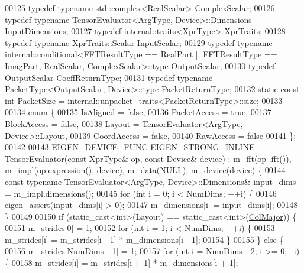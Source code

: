 \begin{DoxyCode}
00125   \textcolor{keyword}{typedef} \textcolor{keyword}{typename} std::complex<RealScalar> ComplexScalar;
00126   \textcolor{keyword}{typedef} \textcolor{keyword}{typename} TensorEvaluator<ArgType, Device>::Dimensions InputDimensions;
00127   \textcolor{keyword}{typedef} internal::traits<XprType> XprTraits;
00128   \textcolor{keyword}{typedef} \textcolor{keyword}{typename} XprTraits::Scalar InputScalar;
00129   \textcolor{keyword}{typedef} \textcolor{keyword}{typename} internal::conditional<FFTResultType == RealPart || FFTResultType == ImagPart,
       RealScalar, ComplexScalar>::type OutputScalar;
00130   \textcolor{keyword}{typedef} OutputScalar CoeffReturnType;
00131   \textcolor{keyword}{typedef} \textcolor{keyword}{typename} PacketType<OutputScalar, Device>::type PacketReturnType;
00132   \textcolor{keyword}{static} \textcolor{keyword}{const} \textcolor{keywordtype}{int} PacketSize = internal::unpacket\_traits<PacketReturnType>::size;
00133 
00134   \textcolor{keyword}{enum} \{
00135     IsAligned = \textcolor{keyword}{false},
00136     PacketAccess = \textcolor{keyword}{true},
00137     BlockAccess = \textcolor{keyword}{false},
00138     Layout = TensorEvaluator<ArgType, Device>::Layout,
00139     CoordAccess = \textcolor{keyword}{false},
00140     RawAccess = \textcolor{keyword}{false}
00141   \};
00142 
00143   EIGEN\_DEVICE\_FUNC EIGEN\_STRONG\_INLINE TensorEvaluator(\textcolor{keyword}{const} XprType& op, \textcolor{keyword}{const} Device& device) : m\_fft(op
      .fft()), m\_impl(op.expression(), device), m\_data(NULL), m\_device(device) \{
00144     \textcolor{keyword}{const} \textcolor{keyword}{typename} TensorEvaluator<ArgType, Device>::Dimensions& input\_dims = m\_impl.dimensions();
00145     \textcolor{keywordflow}{for} (\textcolor{keywordtype}{int} i = 0; i < NumDims; ++i) \{
00146       eigen\_assert(input\_dims[i] > 0);
00147       m\_dimensions[i] = input\_dims[i];
00148     \}
00149 
00150     \textcolor{keywordflow}{if} (static\_cast<int>(Layout) == static\_cast<int>(\hyperlink{group__enums_ggaacded1a18ae58b0f554751f6cdf9eb13a0cbd4bdd0abcfc0224c5fcb5e4f6669a}{ColMajor})) \{
00151       m\_strides[0] = 1;
00152       \textcolor{keywordflow}{for} (\textcolor{keywordtype}{int} i = 1; i < NumDims; ++i) \{
00153         m\_strides[i] = m\_strides[i - 1] * m\_dimensions[i - 1];
00154       \}
00155     \} \textcolor{keywordflow}{else} \{
00156       m\_strides[NumDims - 1] = 1;
00157       \textcolor{keywordflow}{for} (\textcolor{keywordtype}{int} i = NumDims - 2; i >= 0; --i) \{
00158         m\_strides[i] = m\_strides[i + 1] * m\_dimensions[i + 1];

\end{DoxyCode}

